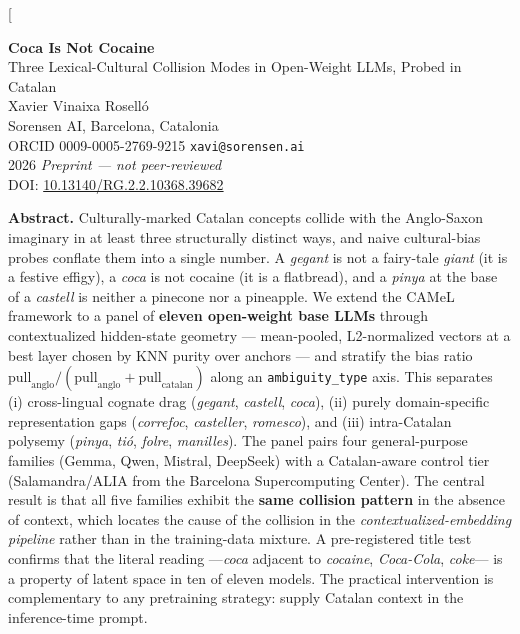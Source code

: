 \documentclass[10pt,twocolumn,a4paper]{article}
\newcommand{\code}[1]{\texttt{\small #1}}
\newcommand{\concept}[1]{\emph{#1}}
\begin{document}
\twocolumn[{%
\vspace{-0.5em}
\begin{center}
  {\LARGE\bfseries Coca Is Not Cocaine}\\[0.45em]
  {\large Three Lexical-Cultural Collision Modes in Open-Weight LLMs, Probed in Catalan}\\[1.1em]
  {\large Xavier Vinaixa Roselló}\\[0.35em]
  {\small Sorensen AI, Barcelona, Catalonia}\\[0.15em]
  {\small ORCID 0009-0005-2769-9215 \quad\textbar\quad \texttt{xavi@sorensen.ai}}\\[0.4em]
  {\small 2026 \quad\textbar\quad \textit{Preprint --- not peer-reviewed}}\\[0.25em]
  {\small DOI: \href{https://doi.org/10.13140/RG.2.2.10368.39682}{10.13140/RG.2.2.10368.39682}}
\end{center}
\vspace{0.8em}
\begin{center}
\begin{minipage}{0.86\textwidth}
\small
\noindent\textbf{Abstract.}
Culturally-marked Catalan concepts collide with the Anglo-Saxon imaginary in
at least three structurally distinct ways, and naive cultural-bias probes
conflate them into a single number. A \concept{gegant} is not a fairy-tale
\emph{giant} (it is a festive effigy), a \concept{coca} is not cocaine (it is
a flatbread), and a \concept{pinya} at the base of a \concept{castell} is
neither a pinecone nor a pineapple. We extend the CAMeL framework
\citep{naous2024} to a panel of \textbf{eleven open-weight base LLMs} through
contextualized hidden-state geometry --- mean-pooled, L2-normalized vectors
at a best layer chosen by KNN purity over anchors --- and stratify the bias
ratio $\text{pull}_{\text{anglo}} / (\text{pull}_{\text{anglo}} +
\text{pull}_{\text{catalan}})$ along an \code{ambiguity\_type} axis. This
separates (i) cross-lingual cognate drag (\concept{gegant}, \concept{castell},
\concept{coca}), (ii) purely domain-specific representation gaps
(\concept{correfoc}, \concept{casteller}, \concept{romesco}), and (iii)
intra-Catalan polysemy (\concept{pinya}, \concept{tió}, \concept{folre},
\concept{manilles}). The panel pairs four general-purpose families (Gemma,
Qwen, Mistral, DeepSeek) with a Catalan-aware control tier (Salamandra/ALIA
from the Barcelona Supercomputing Center). The central result is that all five
families exhibit the \textbf{same collision pattern} in the absence of
context, which locates the cause of the collision in the
\emph{contextualized-embedding pipeline} rather than in the training-data
mixture. A pre-registered title test confirms that the literal reading
---\concept{coca} adjacent to \emph{cocaine}, \emph{Coca-Cola}, \emph{coke}---
is a property of latent space in ten of eleven models. The practical
intervention is complementary to any pretraining strategy: supply Catalan
context in the inference-time prompt.


\end{minipage}
\end{center}}
\end{document}
